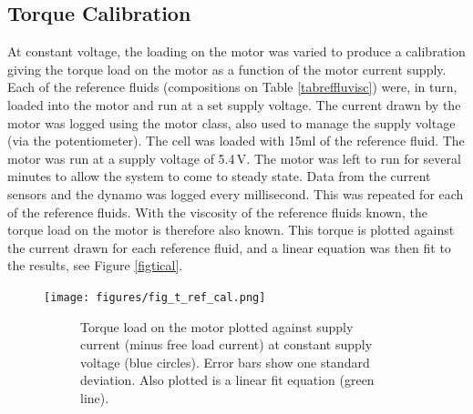 \documentclass[twoside,a4]{report}
\def\br{\newline \newline \noindent}
\begin{document}
	\subsection*{Torque Calibration}
	At constant voltage, the loading on the motor was varied to produce a calibration giving the torque load on the motor as a function of the motor current supply. Each of the reference fluids (compositions on Table \ref{tabreffluvisc}) were, in turn, loaded into the motor and run at a set supply voltage. The current drawn by the motor was logged using the motor class, also used to manage the supply voltage (via the potentiometer).
	\br
	The cell was loaded with 15ml of the reference fluid. The motor was run at a supply voltage of 5.4\,V. The motor was left to run for several minutes to allow the system to come to steady state. Data from the current sensors and the dynamo was logged every millisecond. This was repeated for each of the reference fluids. With the viscosity of the reference fluids known, the torque load on the motor is therefore also known. This torque is plotted against the current drawn for each reference fluid, and a linear equation was then fit to the results, see Figure \ref{figtical}.
	\newline
	\begin{figure}[!htb]
		\centering
		\texttt{[image: figures/fig\_t\_ref\_cal.png]}
		\caption{Torque Calibration Results}
		\label{figtical}
		\begin{subfigure}{0.9\textwidth}
			\footnotesize Torque load on the motor plotted against supply current (minus free load current) at constant supply voltage (blue circles). Error bars show one standard deviation. Also plotted is a linear fit equation (green line).
		\end{subfigure}
	\end{figure}
	
\end{document}
